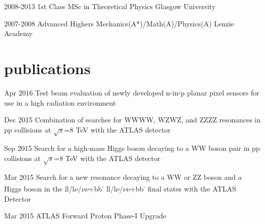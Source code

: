 \documentclass[]{twentysecondcv}
\begin{document}
\begin{twenty}
  \twentyitem
    {2008-2013}
    {1st Class MSc in Theoretical Physics }
    {Glasgow University}
    {}
\end{twenty}

\begin{twenty}
  \twentyitem
    {2007-2008}
    {Advanced Highers Mechanics(A*)/Math(A)/Physics(A)}
    {Lenzie Academy}
    {}
\end{twenty}



\section{publications}

\begin{twentyshort}
  \twentyitemshort
    {Apr 2016}
    {Test beam evaluation of newly developed n-in-p planar pixel sensors for use in a high radiation environment}
\end{twentyshort}


\begin{twentyshort}
  \twentyitemshort
    {Dec 2015}
    {Combination of searches for WWWW, WZWZ, and ZZZZ resonances in pp collisions at $\sqrt{s}$=8 TeV with the ATLAS detector}
\end{twentyshort}


\begin{twentyshort}
  \twentyitemshort
    {Sep 2015}
    {Search for a high-mass Higgs boson decaying to a WW boson pair in pp collisions at $\sqrt{s}$=8 TeV with the ATLAS detector  }
\end{twentyshort}


\begin{twentyshort}
  \twentyitemshort
    {Mar 2015}
    {Search for a new resonance decaying to a WW or ZZ boson and a Higgs boson in the ll/l$\nu/\nu\nu$+bb\textsuperscript{-} ll/l$\nu/\nu\nu$+bb\textsuperscript{-} final states with the ATLAS Detector}
\end{twentyshort}


\begin{twentyshort}
  \twentyitemshort
    {Mar 2015}
    {ATLAS Forward Proton Phase-I Upgrade }
\end{twentyshort}
\end{document}
